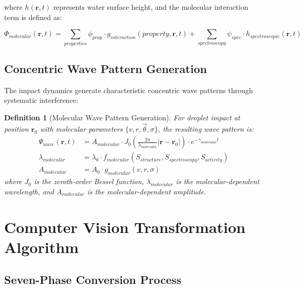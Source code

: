 \documentclass[12pt,a4paper]{article}
\newtheorem{definition}{Definition}
\begin{document}
where $h(\mathbf{r}, t)$ represents water surface height, and the molecular interaction term is defined as:

\begin{equation}
\Phi_{molecular}(\mathbf{r}, t) = \sum_{properties} \phi_{prop} \cdot g_{interaction}(property, \mathbf{r}, t) + \sum_{spectroscopy} \psi_{spec} \cdot h_{spectroscopic}(\mathbf{r}, t)
\end{equation}

\subsection{Concentric Wave Pattern Generation}

The impact dynamics generate characteristic concentric wave patterns through systematic interference:

\begin{definition}[Molecular Wave Pattern Generation]
For droplet impact at position $\mathbf{r}_0$ with molecular parameters $\{v, r, \vec{\theta}, \sigma\}$, the resulting wave pattern is:
\begin{align}
\Psi_{wave}(\mathbf{r}, t) &= A_{molecular} \cdot J_0\left(\frac{2\pi}{\lambda_{molecular}} |\mathbf{r} - \mathbf{r}_0|\right) \cdot e^{-\gamma_{molecular} t} \\
\lambda_{molecular} &= \lambda_0 \cdot f_{molecular}(S_{structure}, S_{spectroscopy}, S_{activity}) \\
A_{molecular} &= A_0 \cdot g_{molecular}(v, r, \sigma)
\end{align}
where $J_0$ is the zeroth-order Bessel function, $\lambda_{molecular}$ is the molecular-dependent wavelength, and $A_{molecular}$ is the molecular-dependent amplitude.
\end{definition}

\section{Computer Vision Transformation Algorithm}

\subsection{Seven-Phase Conversion Process}
\end{document}
